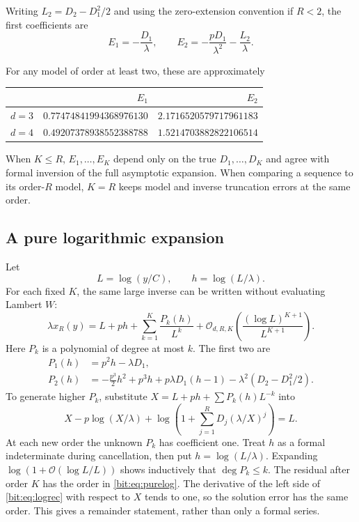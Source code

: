 \documentclass[11pt]{article}
\theoremstyle{definition}\newtheorem{definition}[theorem]{Definition}
\theoremstyle{remark}\newtheorem{remark}[theorem]{Remark}
\newcommand{\bigO}{\mathcal O}
\begin{document}
Writing $L_2=D_2-D_1^2/2$ and using the zero-extension convention if $R<2$, the first coefficients are
\begin{equation}
 E_1=-\frac{D_1}{\lambda},\qquad
 E_2=-\frac{pD_1}{\lambda^2}-\frac{L_2}{\lambda}.
 \label{bit:eq:E12}
\end{equation}
\begin{samepage}
For any model of order at least two, these are approximately
\begin{center}
\begin{tabular}{@{}crr@{}}
\toprule
 & $E_1$ & $E_2$\\\midrule
$d=3$ & $0.77474841994368976130$ & $2.1716520579717961183$\\
$d=4$ & $0.49207378938552388788$ & $1.5214703882822106514$\\
\bottomrule
\end{tabular}
\end{center}
\end{samepage}
When $K\le R$, $E_1,\ldots,E_K$ depend only on the true $D_1,\ldots,D_K$ and agree with formal inversion of the full asymptotic expansion. When comparing a sequence to its order-$R$ model, $K=R$ keeps model and inverse truncation errors at the same order.

\subsection{A pure logarithmic expansion}
Let
\begin{equation}
 L=\log(y/C),\qquad h=\log(L/\lambda).
 \label{bit:eq:Lh}
\end{equation}
For each fixed $K$, the same large inverse can be written without evaluating Lambert $W$:
\begin{equation}
 \lambda x_R(y)=L+ph+\sum_{k=1}^K\frac{P_k(h)}{L^k}
       +\bigO_{d,R,K}\!\left(\frac{(\log L)^{K+1}}{L^{K+1}}\right).
 \label{bit:eq:purelog}
\end{equation}
Here $P_k$ is a polynomial of degree at most $k$. The first two are
\begin{align}
 P_1(h)&=p^2h-\lambda D_1,\label{bit:eq:P1}\\
 P_2(h)&=-\frac{p^3}{2}h^2+p^3h+p\lambda D_1(h-1)
                  -\lambda^2(D_2-D_1^2/2).
 \label{bit:eq:P2}
\end{align}
To generate higher $P_k$, substitute $X=L+ph+\sum P_k(h)L^{-k}$ into
\begin{equation}
 X-p\log(X/\lambda)
 +\log\!\left(1+\sum_{j=1}^R D_j(\lambda/X)^j\right)=L.
 \label{bit:eq:logrec}
\end{equation}
At each new order the unknown $P_k$ has coefficient one. Treat $h$ as a formal indeterminate during cancellation, then put $h=\log(L/\lambda)$. Expanding $\log(1+\bigO(\log L/L))$ shows inductively that $\deg P_k\le k$. The residual after order $K$ has the order in \eqref{bit:eq:purelog}. The derivative of the left side of \eqref{bit:eq:logrec} with respect to $X$ tends to one, so the solution error has the same order. This gives a remainder statement, rather than only a formal series.
\end{document}
